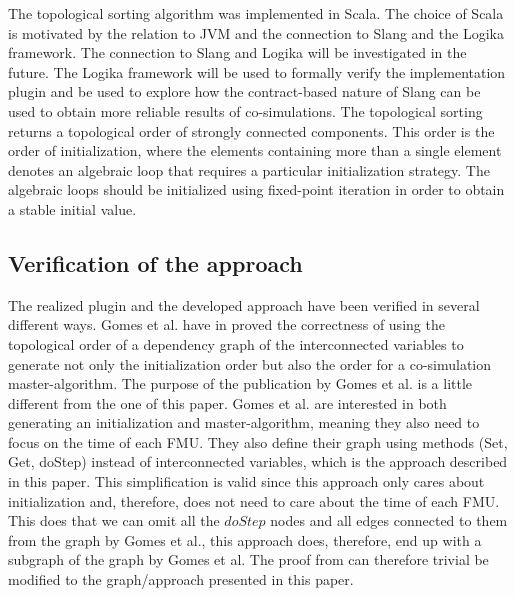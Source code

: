 \documentclass[runningheads]{llncs}
\begin{document}
The topological sorting algorithm was implemented in Scala. The choice of Scala is motivated by the relation to JVM and the connection to Slang and the Logika framework\cite{inbook}. The connection to Slang and Logika will be investigated in the future. The Logika framework will be used to formally verify the implementation plugin and be used to explore how the contract-based nature of Slang can be used to obtain more reliable results of co-simulations. The topological sorting returns a topological order of strongly connected components. This order is the order of initialization, where the elements containing more than a single element denotes an algebraic loop that requires a particular initialization strategy. The algebraic loops should be initialized using fixed-point iteration in order to obtain a stable initial value.

\subsection{Verification of the approach}
The realized plugin and the developed approach have been verified in several different ways. Gomes et al. have in \cite{gomes_lucio_vangheluwe_2019} proved the correctness of using the topological order of a dependency graph of the interconnected variables to generate not only the initialization order but also the order for a co-simulation master-algorithm. The purpose of the publication by Gomes et al. is a little different from the one of this paper. Gomes et al. are interested in both generating an initialization and master-algorithm, meaning they also need to focus on the time of each FMU. They also define their graph using methods (Set, Get, doStep) instead of interconnected variables, which is the approach described in this paper. This simplification is valid since this approach only cares about initialization and, therefore, does not need to care about the time of each FMU. This does that we can omit all the $doStep$ nodes and all edges connected to them from the graph by Gomes et al., this approach does, therefore, end up with a subgraph of the graph by Gomes et al. The proof from \cite{gomes_lucio_vangheluwe_2019} can therefore trivial be modified to the graph/approach presented in this paper.
\end{document}
